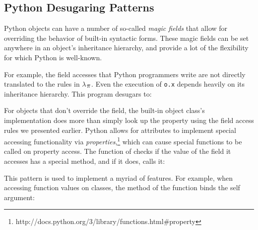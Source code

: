 \documentclass[10pt]{sigplanconf}
\newcommand{\Scribtexttt}[1]{{\texttt{#1}}}
\newcommand{\textsub}[1]{$_{\hbox{\textsmaller{#1}}}$}
\newcommand{\Larger}[1]{\textlarger{#1}}
\newenvironment{SCentered}{\begin{trivlist}\item \centering}{\end{trivlist}}
\let\SOriginalthesubsubsection\thesubsubsection
\newcommand{\Ssubsection}[2]{\subsection[#1]{#2}\let\thesubsubsection\SOriginalthesubsubsection}
\newcommand{\NoteBox}[1]{\footnote{#1}}
\newcommand{\NoteContent}[1]{#1}
\begin{document}
\Ssubsection{Python Desugaring Patterns}{Python Desugaring Patterns}\label{t:x28part_x22Pythonx5fDesugaringx5fPatternsx22x29}

Python objects can have a number of so{-}called \textit{magic fields} that allow
for overriding the behavior of built{-}in syntactic forms.  These magic fields
can be set anywhere in an object{'}s inheritance hierarchy, and provide a lot of
the flexibility for which Python is well{-}known.

For example, the field accesses that Python programmers write are not directly
translated to the rules in $\lambda$\textsub{\Larger{$\pi$}}.  Even the execution of \Scribtexttt{o{\hbox{\texttt{.}}}x}
depends heavily on its inheritance hierarchy.  This
program desugars to:


\noindent \begin{SCentered}\end{SCentered}

\noindent For objects that don{'}t override the  field, the
built{-}in object class{'}s implementation does more than simply look up the
 property using the field access rules we presented earlier.
Python allows for attributes to implement special accessing functionality via
\textit{properties},\NoteBox{\NoteContent{http://docs.python.org/3/library/functions.html\#property}}
which can cause special functions to be called on property access.  The
 function of  checks
if the value of the field it accesses has a special 
method, and if it does, calls it:


\noindent \begin{SCentered}\end{SCentered}

This pattern is used to implement a myriad of features.  For example, when
accessing function values on classes, the  method of the
function binds the self argument:
\end{document}
